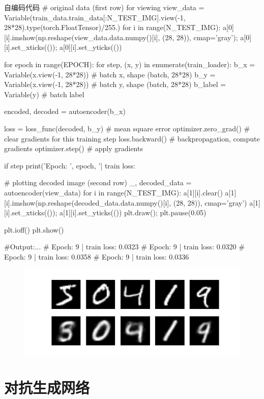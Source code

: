 \documentclass[openbib]{article}
\begin{document}
\begin{Python}{自编码代码}
# original data (first row) for viewing
view_data = Variable(train_data.train_data[:N_TEST_IMG].view(-1, 28*28).type(torch.FloatTensor)/255.)
for i in range(N_TEST_IMG):
	a[0][i].imshow(np.reshape(view_data.data.numpy()[i], (28, 28)), cmap='gray'); a[0][i].set_xticks(()); a[0][i].set_yticks(())

for epoch in range(EPOCH):
	for step, (x, y) in enumerate(train_loader):
		b_x = Variable(x.view(-1, 28*28))   # batch x, shape (batch, 28*28)
		b_y = Variable(x.view(-1, 28*28))   # batch y, shape (batch, 28*28)
		b_label = Variable(y)               # batch label

		encoded, decoded = autoencoder(b_x)
		
		loss = loss_func(decoded, b_y)      # mean square error
		optimizer.zero_grad()               # clear gradients for this training step
		loss.backward()                     # backpropagation, compute gradients
		optimizer.step()                    # apply gradients

		if step %
			print('Epoch: ', epoch, '| train loss: %
			
			# plotting decoded image (second row)
			_, decoded_data = autoencoder(view_data)
			for i in range(N_TEST_IMG):
				a[1][i].clear()
				a[1][i].imshow(np.reshape(decoded_data.data.numpy()[i], (28, 28)), cmap='gray')
				a[1][i].set_xticks(()); a[1][i].set_yticks(())
			plt.draw(); plt.pause(0.05)

plt.ioff()
plt.show()

#Output:...
#		Epoch:  9 | train loss: 0.0323
#		Epoch:  9 | train loss: 0.0320
#		Epoch:  9 | train loss: 0.0358
#		Epoch:  9 | train loss: 0.0336
\end{Python}
\begin{figure}[htbp]
	\centering
	\includegraphics[scale=0.5]{输出结果}
\end{figure}
\section{对抗生成网络}
\end{document}
